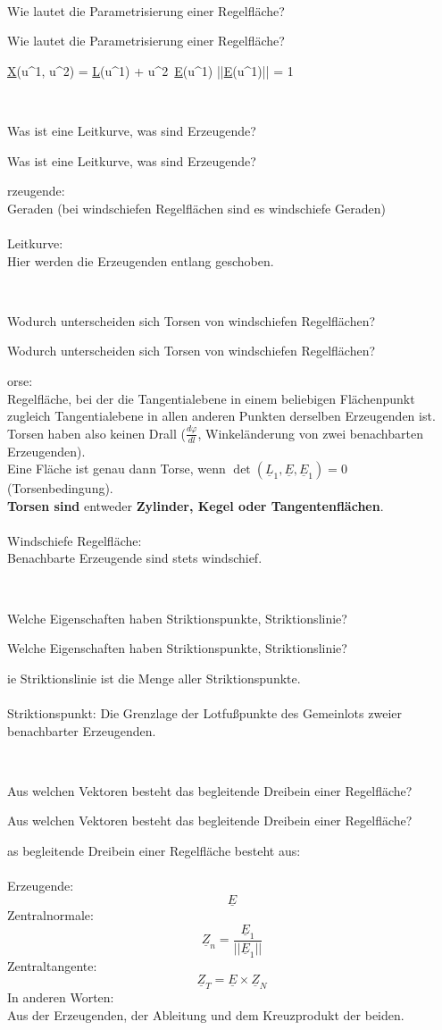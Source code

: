 \documentclass[DIV=1]{scrartcl}
\newcommand{\frage}[3][10]{
    \newpage
    \
    \vspace{#1 em}
    \begin{framed}
        #2
    \end{framed}
    \newpage
    \begin{framed}
        #2
    \end{framed}
    \vspace{2 em}
}
\begin{document}



\frage{Wie lautet die Parametrisierung einer Regelfläche?}

\[
    \underline{X}(u^1, u^2) = \underline{L}(u^1) + u^2\, \underline{E}(u^1)
    \quad \text{mit} \quad ||\underline{E}(u^1)|| = 1
\]



\frage{Was ist eine Leitkurve, was sind Erzeugende?}

Erzeugende:\\
Geraden (bei windschiefen Regelflächen sind es windschiefe Geraden)\\
\\
Leitkurve:\\
Hier werden die Erzeugenden entlang geschoben.




\frage{Wodurch unterscheiden sich Torsen von windschiefen Regelflächen?}

Torse:\\
Regelfläche, bei der die Tangentialebene in einem beliebigen Flächenpunkt zugleich Tangentialebene in allen anderen Punkten derselben Erzeugenden ist. Torsen haben also keinen Drall ($\frac{d\varphi}{dl}$, Winkeländerung von zwei benachbarten Erzeugenden).\\
Eine Fläche ist genau dann Torse, wenn $\det(\underline{L}_1, \underline{E}, \underline{E}_1) = 0$ (Torsenbedingung).\\
\textbf{Torsen sind} entweder \textbf{Zylinder, Kegel oder Tangentenflächen}.\\
\\
Windschiefe Regelfläche:\\
Benachbarte Erzeugende sind stets windschief.




\frage{Welche Eigenschaften haben Striktionspunkte, Striktionslinie?}

Die Striktionslinie ist die Menge aller Striktionspunkte.\\
\\
Striktionspunkt: Die Grenzlage der Lotfußpunkte des Gemeinlots zweier benachbarter Erzeugenden.



\frage{Aus welchen Vektoren besteht das begleitende Dreibein einer Regelfläche?}

Das begleitende Dreibein einer Regelfläche besteht aus:\\
\\
Erzeugende:
\[
    \underline{E}
\]
Zentralnormale:
\[
    \underline{Z}_n = \frac{\underline{E}_1}{||\underline{E}_1||}
\]
Zentraltangente:
\[
    \underline{Z}_T = \underline{E} \times \underline{Z}_N
\]
In anderen Worten:\\
Aus der Erzeugenden, der Ableitung und dem Kreuzprodukt der beiden.




\end{document}

